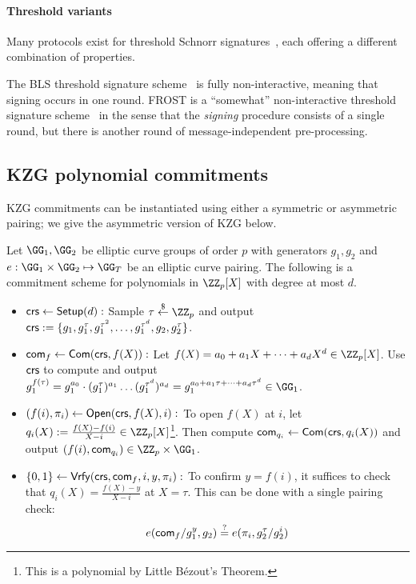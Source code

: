 
\paragraph{Threshold variants}
Many protocols exist for threshold Schnorr signatures~, each offering a different combination of properties. 

The BLS threshold signature scheme~\cite{AC:BonLynSha01} is fully non-interactive, meaning that signing occurs in one round.
FROST is a ``somewhat'' non-interactive threshold signature scheme~\cite{EPRINT:BelTesZhu22} in the sense that the \emph{signing} procedure consists of a single round, but there is another round of message-independent pre-processing.     

\subsection{KZG polynomial commitments}\label{sec:kzg}

KZG commitments can be instantiated using either a symmetric or asymmetric pairing; we give the asymmetric version of KZG below.

\begin{construction}
Let $\GG_1, \GG_2$ be elliptic curve groups of order $p$ with generators $g_1,g_2$ and $e: \GG_1 \times \GG_2 \mapsto \GG_T$ be an elliptic curve pairing. The following is a commitment scheme for polynomials in $\ZZ_p[X]$ with degree at most $d$.
\begin{itemize}
    \item \underline{$\mathsf{crs} \gets \mathsf{Setup}(d):$} Sample $\tau \sample \ZZ_p$ and output $\mathsf{crs} := \{g_1, g_1^\tau, g_1^{\tau^2}, \dots, g_1^{\tau^d},\allowbreak g_2, g_2^\tau\}$.
    \item \underline{$\mathsf{com}_f \gets \mathsf{Com}(\mathsf{crs}, f(X)):$} Let $f(X) = a_0 + a_1 X + \dots + a_d X^d \in \ZZ_p[X]$. Use $\mathsf{crs}$ to compute and output $g_1^{f(\tau)} = g_1^{a_0} \cdot (g_1^\tau)^{a_1} \dots (g_1^{\tau^d})^{a_d} = g_1^{a_0 + a_1 \tau + \dots + a_d \tau^d}\allowbreak \in \GG_1$.
    \item \underline{$(f(i), \pi_i) \gets \mathsf{Open}(\mathsf{crs}, f(X), i):$} To open $f(X)$ at $i$, let $q_i(X) := \frac{f(X) - f(i)}{X - i}\allowbreak \in \ZZ_p[X]$\footnote{This is a polynomial by Little Bézout's Theorem.}. Then compute $\mathsf{com}_{q_i} \gets \mathsf{Com}(\mathsf{crs}, q_i(X))$ and output $(f(i),\allowbreak \com_{q_i}) \in \ZZ_p \times \GG_1$.
    \item \underline{$\{0,1\} \gets \mathsf{Vrfy}(\mathsf{crs}, \mathsf{com}_f, i, y, \pi_i):$} To confirm $y = f(i)$, it suffices to check that $q_i(X) = \frac{f(X) - y}{X - i}$ at $X=\tau$. This can be done with a single pairing check:
    \[
        e(\mathsf{com}_f / g_1^y, g_2) \stackrel{?}{=} e(\pi_i, g_2^\tau / g_2^i)
    \]
\end{itemize}
\end{construction}

